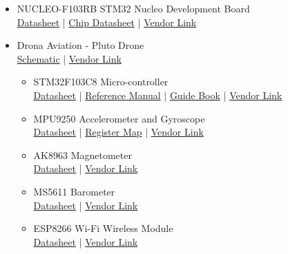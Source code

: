 \documentclass[a4paper,12pt,oneside]{book}
\begin{document}
\begin{itemize}
\item NUCLEO-F103RB STM32 Nucleo Development Board \\
\href{./datasheets/Nucleo STM32 Board.pdf}{Datasheet} | \href{./datasheets/STM32F103X.pdf}{Chip Datasheet} | \href{http://in.element14.com/stmicroelectronics/nucleo-f103rb/nucleo-board-stm32f103rbt6-mcu/dp/2394226}{Vendor Link}

\item Drona Aviation - Pluto Drone \\
\href{./datasheets/Pluto Drone Schematic.pdf}{Schematic} | \href{http://www.dronaaviation.com/}{Vendor Link}

\begin{itemize}
\item STM32F103C8 Micro-controller\\
\href{./datasheets/STM32F103X.pdf}{Datasheet} | \href{./datasheets/STM32F1 Reference Manual.pdf}{Reference Manual} | \href{./datasheets/Geoffrey Brown - Discovering the STM32 Microcontroller.pdf}{Guide Book} | \href{http://www.amazon.in/STM32F103C8T6-Minimum-System-Development-Arduino/dp/B01EM11KOC/ref=sr_1_1?ie=UTF8&qid=1499069205&sr=8-1&keywords=STM32F103C8T6}{Vendor Link}

\item MPU9250 Accelerometer and Gyroscope \\
\href{./datasheets/MPU9250 Datasheet.pdf}{Datasheet} | \href{./datasheets/MPU9250 Register Map.pdf}{Register Map} | \href{http://www.amazon.in/Generic-MPU-9250-Communications-gyroscope-accelerometer/dp/B06XPLH7KD/ref=sr_1_2?ie=UTF8&qid=1499068377&sr=8-2&keywords=mpu9250}{Vendor Link}

\item AK8963 Magnetometer \\
\href{./datasheets/AK8963.pdf}{Datasheet} | \href{http://www.amazon.in/Generic-MPU-9250-Communications-gyroscope-accelerometer/dp/B06XPLH7KD/ref=sr_1_2?ie=UTF8&qid=1499068377&sr=8-2&keywords=mpu9250}{Vendor Link}

\item MS5611 Barometer\\
\href{./datasheets/MS5611-01BA03.pdf}{Datasheet} | \href{http://www.amazon.in/MS5611-High-Resolution-Atmospheric-Pressure-Arduino/dp/B00ZA7DMGC/ref=sr_1_3?ie=UTF8&qid=1499068488&sr=8-3&keywords=ms5611}{Vendor Link}

\item ESP8266 Wi-Fi Wireless Module\\
\href{./datasheets/ESP8266-Datasheet.pdf}{Datasheet} | \href{http://www.amazon.in/ESP8266-Serial-Wireless-Arduino-Raspberry/dp/B00TS5TMRK/ref=sr_1_3?ie=UTF8&qid=1499068563&sr=8-3&keywords=ESP8266}{Vendor Link}


\end{itemize}
\end{itemize}
\end{document}
